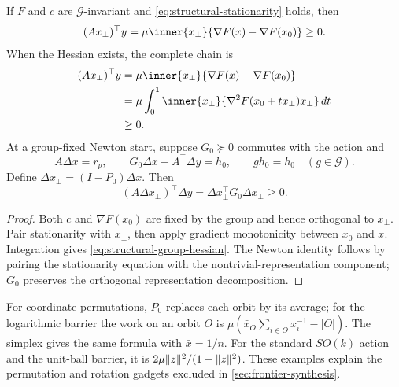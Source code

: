 \begin{theorem}
\label{thm:structural-group-work}
If $F$ and $c$ are $\mathcal G$-invariant and
\eqref{eq:structural-stationarity} holds, then
\begin{equation}
 (Ax_\perp)^\top y
 =\mu\inner{x_\perp}{\nabla F(x)-\nabla F(x_0)}\geq0.
                                                               \label{eq:structural-group-central}
\end{equation}
When the Hessian exists, the complete chain is
\begin{align}
 (Ax_\perp)^\top y
 &=\mu\inner{x_\perp}{\nabla F(x)-\nabla F(x_0)}          \notag\\
 &=\mu\int_0^1\inner{x_\perp}
 {\nabla^2F(x_0+tx_\perp)x_\perp}\,dt                     \notag\\
 &\geq0.                                                  \label{eq:structural-group-hessian}
\end{align}
At a group-fixed Newton start, suppose $G_0\succeq0$ commutes with the action and
\begin{equation}
 A\Delta x=r_p,\qquad
 G_0\Delta x-A^\top\Delta y=h_0,\qquad gh_0=h_0
 \quad(g\in\mathcal G).                                   \label{eq:structural-group-newton-system}
\end{equation}
Define $\Delta x_\perp=(I-P_0)\Delta x$.  Then
\begin{equation}
 (A\Delta x_\perp)^\top\Delta y
 =\Delta x_\perp^\top G_0\Delta x_\perp\geq0.               \label{eq:structural-group-newton}
\end{equation}
\end{theorem}

\begin{proof}
Both $c$ and $\nabla F(x_0)$ are fixed by the group and hence orthogonal to
$x_\perp$.  Pair stationarity with $x_\perp$, then apply gradient
monotonicity between $x_0$ and $x$.  Integration gives
\eqref{eq:structural-group-hessian}.  The Newton identity follows by pairing
the stationarity equation with the nontrivial-representation component;
$G_0$ preserves the orthogonal representation decomposition.
\end{proof}

For coordinate permutations, $P_0$ replaces each orbit by its average; for
the logarithmic barrier the work on an orbit $O$ is
$\mu(\bar x_O\sum_{i\in O}x_i^{-1}-|O|)$.  The simplex gives the same
formula with $\bar x=1/n$.  For the standard $SO(k)$ action and the unit-ball
barrier, it is $2\mu\lVert z\rVert^2/(1-\lVert z\rVert^2)$.  These examples explain the
permutation and rotation gadgets excluded in \cref{sec:frontier-synthesis}.

